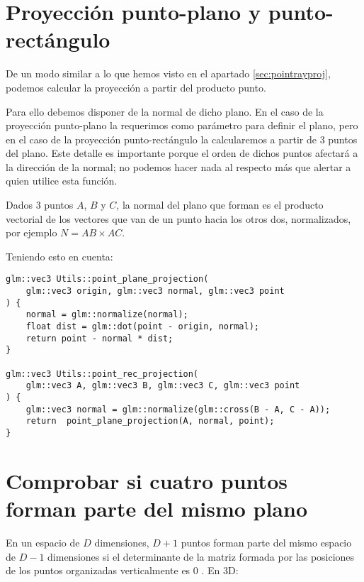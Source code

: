 \clearpage
\section{Proyección punto-plano y punto-rectángulo}
\label{sec:pointplaneproj}
De un modo similar a lo que hemos visto en el apartado \ref{sec:pointrayproj}, podemos calcular la proyección a partir del producto punto.

Para ello debemos disponer de la normal de dicho plano. En el caso de la proyección punto-plano la requerimos como parámetro para definir el plano, pero en el caso de la proyección punto-rectángulo la calcularemos a partir de 3 puntos del plano. Este detalle es importante porque el orden de dichos puntos afectará a la dirección de la normal; no podemos hacer nada al respecto más que alertar a quien utilice esta función.

Dados 3 puntos $A$, $B$ y $C$, la normal del plano que forman es el producto vectorial de los vectores que van de un punto hacia los otros dos, normalizados, por ejemplo $N = AB \times AC$.

Teniendo esto en cuenta:
\begin{lstlisting}
glm::vec3 Utils::point_plane_projection(
    glm::vec3 origin, glm::vec3 normal, glm::vec3 point
) {
	normal = glm::normalize(normal);
	float dist = glm::dot(point - origin, normal);
	return point - normal * dist;
}

glm::vec3 Utils::point_rec_projection(
    glm::vec3 A, glm::vec3 B, glm::vec3 C, glm::vec3 point
) {
	glm::vec3 normal = glm::normalize(glm::cross(B - A, C - A));
	return  point_plane_projection(A, normal, point);
}
\end{lstlisting}


\section{Comprobar si cuatro puntos forman parte del mismo plano}
\label{sec:check4pointplane}
En un espacio de $D$ dimensiones, $D+1$ puntos forman parte del mismo espacio de $D-1$ dimensiones si el determinante de la matriz formada por las posiciones de los puntos organizadas verticalmente es 0 . En 3D:

